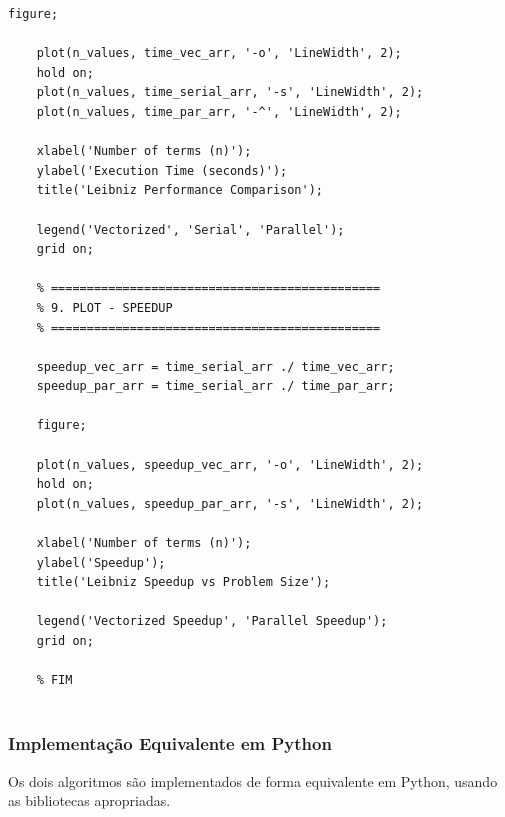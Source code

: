 \documentclass[12pt, a4paper]{article}
\begin{document}
\begin{lstlisting}[style=matlab, caption={pratica02.m}, label={lst:matlab}]
	figure;
	
	plot(n_values, time_vec_arr, '-o', 'LineWidth', 2);
	hold on;
	plot(n_values, time_serial_arr, '-s', 'LineWidth', 2);
	plot(n_values, time_par_arr, '-^', 'LineWidth', 2);
	
	xlabel('Number of terms (n)');
	ylabel('Execution Time (seconds)');
	title('Leibniz Performance Comparison');
	
	legend('Vectorized', 'Serial', 'Parallel');
	grid on;
	
	% ==============================================
	% 9. PLOT - SPEEDUP
	% ==============================================
	
	speedup_vec_arr = time_serial_arr ./ time_vec_arr;
	speedup_par_arr = time_serial_arr ./ time_par_arr;
	
	figure;
	
	plot(n_values, speedup_vec_arr, '-o', 'LineWidth', 2);
	hold on;
	plot(n_values, speedup_par_arr, '-s', 'LineWidth', 2);
	
	xlabel('Number of terms (n)');
	ylabel('Speedup');
	title('Leibniz Speedup vs Problem Size');
	
	legend('Vectorized Speedup', 'Parallel Speedup');
	grid on;
	
	% FIM
		
	\end{lstlisting}
	
	\subsubsection{Implementação Equivalente em Python}
	
	Os dois algoritmos são implementados de forma equivalente em Python, usando as bibliotecas apropriadas.
	
\end{document}
